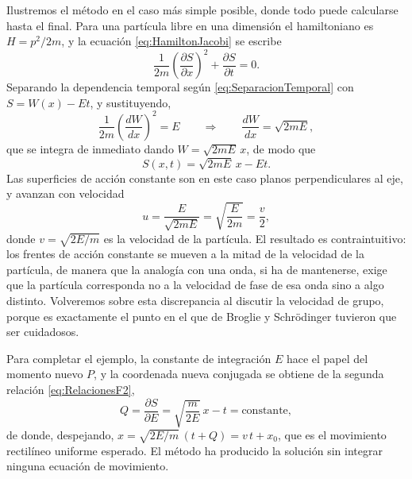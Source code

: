         Ilustremos el método en el caso más simple posible, donde todo puede calcularse hasta el final. Para una partícula libre en una dimensión el hamiltoniano es $H = p^{2}/2m$, y la ecuación \eqref{eq:HamiltonJacobi} se escribe
        \begin{equation}\label{eq:HJLibre}
            \frac{1}{2m}\left(\frac{\partial S}{\partial x}\right)^{2} + \frac{\partial S}{\partial t} = 0 .
        \end{equation}
        Separando la dependencia temporal según \eqref{eq:SeparacionTemporal} con $S = W(x) - Et$, y sustituyendo,
        \begin{equation}\label{eq:HJLibre2}
            \frac{1}{2m}\left(\frac{dW}{dx}\right)^{2} = E
            \qquad\Longrightarrow\qquad
            \frac{dW}{dx} = \sqrt{2mE},
        \end{equation}
        que se integra de inmediato dando $W = \sqrt{2mE}\,x$, de modo que
        \begin{equation}\label{eq:SLibre}
            S(x,t) = \sqrt{2mE}\,x - Et .
        \end{equation}
        Las superficies de acción constante son en este caso planos perpendiculares al eje, y avanzan con velocidad
        \begin{equation}\label{eq:VelocidadFrente}
            u = \frac{E}{\sqrt{2mE}} = \sqrt{\frac{E}{2m}} = \frac{v}{2},
        \end{equation}
        donde $v = \sqrt{2E/m}$ es la velocidad de la partícula. El resultado es contraintuitivo: los frentes de acción constante se mueven a la mitad de la velocidad de la partícula, de manera que la analogía con una onda, si ha de mantenerse, exige que la partícula corresponda no a la velocidad de fase de esa onda sino a algo distinto. Volveremos sobre esta discrepancia al discutir la velocidad de grupo, porque es exactamente el punto en el que de Broglie y Schrödinger tuvieron que ser cuidadosos.

        Para completar el ejemplo, la constante de integración $E$ hace el papel del momento nuevo $P$, y la coordenada nueva conjugada se obtiene de la segunda relación \eqref{eq:RelacionesF2},
        \begin{equation}\label{eq:QLibre}
            Q = \frac{\partial S}{\partial E} = \sqrt{\frac{m}{2E}}\,x - t = \text{constante},
        \end{equation}
        de donde, despejando, $x = \sqrt{2E/m}\,(t + Q) = v\,t + x_{0}$, que es el movimiento rectilíneo uniforme esperado. El método ha producido la solución sin integrar ninguna ecuación de movimiento.

